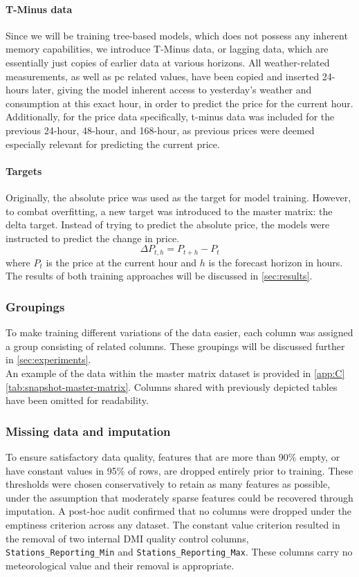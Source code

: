 \paragraph{T-Minus data}
Since we will be training tree-based
models, which does not possess any inherent memory capabilities, we introduce 
T-Minus data, or lagging data, which are
essentially just copies of earlier data at various 
horizons. All
weather-related measurements, as well as \gls{pc} related values,
have been copied and inserted 24-hours later, giving the model
inherent access to yesterday's weather and 
consumption at this
exact hour, in order to predict the price for the current hour.
Additionally, for the price data specifically, t-minus data was
included for the previous 24-hour, 48-hour, and 
168-hour, as
previous prices were deemed especially relevant for predicting
the current price.
\paragraph{Targets}
Originally, the absolute price was used as the target for model training. 
However, to combat overfitting, a new target was introduced to the master 
matrix: the delta target. Instead of trying to predict the absolute price, the 
models were instructed to predict the change in price.
\begin{equation}\label{eq:delta}
	\Delta P_{t,h} = P_{t+h} - P_t
\end{equation}
where $P_t$ is the price at the current hour and $h$ is the forecast 
horizon in hours.\\
The results of 
both training approaches will be discussed in \autoref{sec:results}.
\subsubsection{Groupings}
To make training different variations of the data easier, each column was 
assigned a group consisting of related columns. These groupings will be 
discussed further in \autoref{sec:experiments}.\\
An example of the data within the master matrix dataset is
provided in \cref{app:C} 
\autoref{tab:snapshot-master-matrix}. Columns 
shared with previously
depicted tables have been omitted for readability.

\subsubsection{Missing data and imputation}
To ensure satisfactory data quality, features that are more than 90\% 
empty, or have constant values in 95\% of rows, are dropped entirely prior to 
training. These thresholds were chosen conservatively to retain as many 
features as possible, under the assumption that moderately sparse features 
could be recovered through imputation. A post-hoc audit confirmed that no 
columns were dropped under the emptiness criterion across any dataset. The 
constant value criterion resulted in the removal of two internal DMI 
quality control columns, \texttt{Stations\_Reporting\_Min} and 
\texttt{Stations\_Reporting\_Max}. These columns carry no 
meteorological value and their removal is appropriate.

